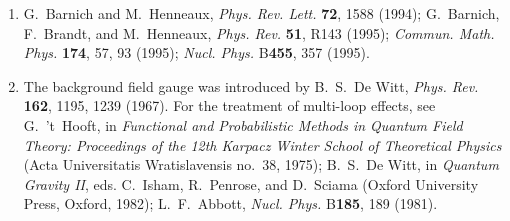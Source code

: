 \begin{enumerate}
  \item {}\label{ch17-ref-4}
  G.~Barnich and M.~Henneaux, \textit{Phys. Rev. Lett.} \textbf{72}, 1588 (1994); G.~Barnich, F.~Brandt, and M.~Henneaux, \textit{Phys. Rev.} \textbf{51}, R143 (1995); \textit{Commun. Math. Phys.} \textbf{174}, 57, 93 (1995); \textit{Nucl. Phys.} B\textbf{455}, 357 (1995).

  \item {}\label{ch17-ref-5}
  The background field gauge was introduced by B.~S.~De Witt, \textit{Phys. Rev.} \textbf{162}, 1195, 1239 (1967). For the treatment of multi-loop effects, see G.~'t~Hooft, in \textit{Functional and Probabilistic Methods in Quantum Field Theory: Proceedings of the 12th Karpacz Winter School of Theoretical Physics} (Acta Universitatis Wratislavensis no.~38, 1975); B.~S.~De Witt, in \textit{Quantum Gravity II}, eds. C.~Isham, R.~Penrose, and D.~Sciama (Oxford University Press, Oxford, 1982); L.~F.~Abbott, \textit{Nucl. Phys.} B\textbf{185}, 189 (1981).
\end{enumerate}
